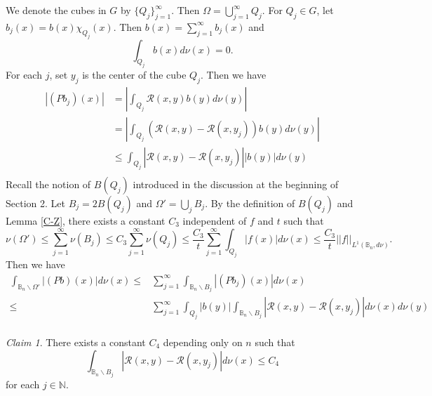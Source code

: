 \documentclass[12pt]{amsart}
\theoremstyle{definition}
\theoremstyle{remark}
\newtheorem{claim}{Claim}[section]
\newcommand{\N}{\mathbb{N}}
\newcommand{\B}{\mathbb{B}}
\begin{document}
We denote the cubes in $G$ by $\{Q_j\}_{j=1}^\infty$.
Then $\Omega=\bigcup\limits_{j=1}^\infty Q_j$.
For $Q_j\in G$, let $b_j(x)=b(x)\chi_{Q_j}(x)$. Then $b(x)=\sum\limits_{j=1}^\infty b_j(x)$ and
\[
	\int_{Q_j}b(x)d\nu (x)=0.
\]
For each $j$, set $y_j$ is the center of the cube $Q_j$.
Then we have
\begin{equation*}
	\begin{aligned}
		|(P  b_j)(x)|&=\left|\int_{Q_j}\mathcal{R} (x,y)b(y)d\nu (y)\right|\\
		&=\left|\int_{Q_j}(\mathcal{R} (x,y)-\mathcal{R} (x,y_j))b(y)d\nu (y)\right|\\
		&\leqslant\int_{Q_j}|\mathcal{R} (x,y)-\mathcal{R} (x,y_j)| |b(y)|d\nu (y)\\
	\end{aligned}
\end{equation*}
Recall the notion of $B(Q_j)$ introduced in the discussion at the beginning of Section 2.
Let $B_j=2B(Q_j)$ and $\Omega'=\bigcup\limits_{j}B_j$. 
By the definition of $B(Q_j)$ and Lemma \ref{C-Z}, there exists a constant $C_3$ independent of $f$ and $t$ such that 
\[\nu (\Omega')
\leqslant \sum\limits_{j=1}^\infty \nu (B_j)
\leqslant C_3 \sum\limits_{j=1}^\infty \nu (Q_j)
\leqslant \frac{C_3}{t}\sum\limits_{j=1}^\infty\int_{Q_j}|f(x)|d\nu (x)
\leqslant \frac{C_3}{t}||f||_{L^1(\B_n,d\nu)}.\]
Then we have
\begin{equation}\label{**}
	\begin{aligned}
		\int_{\B_n\backslash\Omega'}|(P  b)(x)|d\nu (x)\leqslant&\sum\limits_{j=1}^\infty\int_{\B_n\backslash B_j}|(P  b_j)(x)|d\nu (x)\\
		\leqslant&\sum\limits_{j=1}^\infty\int_{Q_j}|b(y)|\int_{\B_n\backslash B_j}|\mathcal{R} (x,y)-\mathcal{R} (x,y_j)|d\nu (x)d\nu (y)\\
	\end{aligned}
\end{equation}

\begin{claim}\label{claim2.1}
	There exists a constant $C_4$ depending only on $n$ such that
	\[\int_{\B_n\backslash B_j}|\mathcal{R} (x,y)-\mathcal{R} (x,y_j)|d\nu (x)\leqslant C_4\]
	for each $j\in\N$.
\end{claim}
\end{document}
